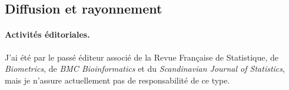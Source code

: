 \subsection{Diffusion et rayonnement}




\paragraph{Activités éditoriales.}
J'ai été par le passé éditeur associé de la Revue Française de Statistique, de {\sl Biometrics}, de {\sl BMC Bioinformatics} et du {\sl Scandinavian Journal of Statistics}, mais je n'assure actuellement pas de responsabilité de ce type. 

